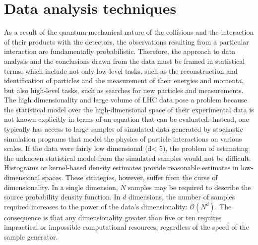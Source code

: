\chapter{Data analysis techniques}
\label{ch:methods}

As a result of the quantum-mechanical nature of the collisions and the interaction of their products with the detectors, the observations resulting from a particular interaction are fundamentally probabilistic. 
%
Therefore, the approach to data analysis and the conclusions drawn from the data must be framed in statistical terms, which include not only low-level tasks, such as the reconstruction and identification of particles and the measurement of their energies and momenta, but also high-level tasks, such as searches for new particles and measurements.
%
The high dimensionality and large volume of LHC data pose a problem because the statistical model over the high-dimensional space of their experimental data is not known explicitly in terms of an equation that can be evaluated. 
%
Instead, one typically has access to large samples of simulated data generated by stochastic simulation programs that model the physics of particle interactions on various scales. 
%
If the data were fairly low dimensional (d< 5), the problem of estimating the unknown statistical model from the simulated samples would not be difficult.
%
Histograms or kernel-based density estimates provide reasonable estimates in low-dimensional spaces. 
%
These strategies, however, suffer from the curse of dimensionality. 
%
In a single dimension, \(N\) samples may be required to describe the source probability density function. 
%
In \(d\) dimensions, the number of samples required increases to the power of the data’s dimensionality: \(\mathcal{O}(N^d)\). 
%
The consequence is that any dimensionality greater than five or ten requires impractical or impossible computational resources, regardless of the speed of the sample generator.

%
